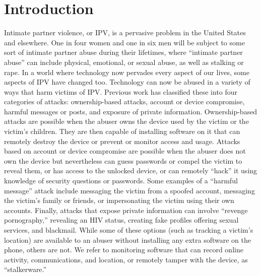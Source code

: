 \documentclass[acmtog]{acmart}
\begin{document}
\maketitle

\section{Introduction}
Intimate partner violence, or IPV, is a pervasive problem in the United States 
and elsewhere. One in four women and one in six men will be subject to some 
sort of intimate 
partner abuse during their lifetimes, where ``intimate partner abuse'' can 
include physical, emotional, or sexual abuse, as well as stalking or rape. In a 
world where technology now pervades every aspect of our lives, some 
aspects of IPV have changed too. Technology can now be abused in a variety of 
ways that harm victims of IPV. Previous work \cite{ristenpart_ucsd_talk} has 
classified these into four categories of attacks: ownership-based attacks, 
account or device compromise, harmful messages or posts, and exposure of 
private 
information. Ownership-based attacks are possible when the abuser owns the 
device used by the victim or the victim's children. They are then capable 
of installing software on it that can remotely destroy the device or prevent or 
monitor access and usage. Attacks based on account or device compromise are 
possible when the abuser does not own the device but nevertheless can guess 
passwords or compel the victim to reveal them, or has access to the unlocked 
device, or can remotely ``hack'' it using knowledge of security questions or 
passwords. Some examples of a ``harmful message'' attack include messaging the 
victim from a spoofed account, messaging the victim's family or friends, or 
impersonating the victim using their own accounts. Finally, attacks that expose 
private information can involve ``revenge pornography,'' revealing an HIV 
status, creating fake profiles offering sexual services, and blackmail. While 
some of these options (such as tracking a victim's location) are available to 
an abuser without installing any extra software on the phone, others are not. 
We refer to monitoring software that can record online activity, 
communications, and location, or remotely tamper with the device, as 
``stalkerware.''  
\end{document}
